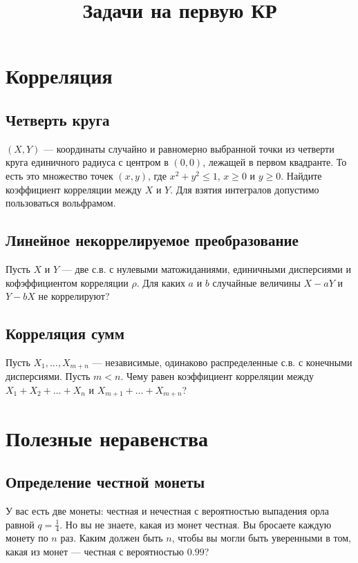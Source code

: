 \documentclass[12pt]{article}
\title{Задачи на первую КР}
\begin{document}
\maketitle

\section{Корреляция}

\subsection{Четверть круга}

$(X, Y)$ --- координаты случайно и равномерно выбранной точки из четверти круга единичного радиуса с центром в $(0, 0)$, лежащей в первом квадранте. То есть это множество точек $(x, y)$, где $x^2 + y^2 \le 1$, $x \ge 0$ и $y \ge 0$. Найдите коэффициент корреляции между $X$ и $Y$. Для взятия интегралов  допустимо пользоваться вольфрамом.

\subsection{Линейное некоррелируемое преобразование}

Пусть $X$ и $Y$ --- две с.в. с нулевыми матожиданиями, единичными дисперсиями и кофэффициентом корреляции $\rho$. Для каких $a$ и $b$ случайные величины $X - aY$ и $Y - bX$ не коррелируют?

\subsection{Корреляция сумм}

Пусть $X_1, \dots, X_{m + n}$ --- независимые, одинаково распределенные с.в. с конечными дисперсиями. Пусть $m < n$. Чему равен коэффициент корреляции между $X_1 + X_2 + \dots + X_n$ и $X_{m + 1} + \dots + X_{m + n}$?

\section{Полезные неравенства}

\subsection{Определение честной монеты}

У вас есть две монеты: честная и нечестная с вероятностью выпадения орла равной $q = \frac{1}{4}$. Но вы не знаете, какая из монет честная. Вы бросаете каждую монету по $n$ раз. Каким должен быть $n$, чтобы вы могли быть уверенными в том, какая из монет --- честная с вероятностью $0.99$? 
\end{document}
